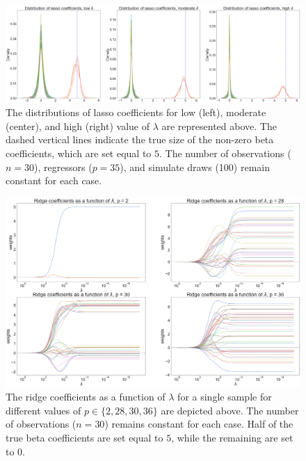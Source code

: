 \begin{figure}[H]
        \includegraphics[scale=0.17]{material/Img/lasso_shrunken_beta_dist_35.png}
        \centering
        \caption[Distribution of lasso coefficients]{The distributions of lasso coefficients for low (left), moderate (center), and high (right) value of $\lambda$ are represented above. The dashed vertical lines indicate the true size of the non-zero beta coefficients, which are set equal to $5$. The number of observations ($n=30$), regressors ($p=35$), and simulate draws (100) remain constant for each case.}
\label{fig:lasso_shrunken_betas}
\end{figure}

\begin{figure}[H]
        \includegraphics[scale=0.20]{material/Img/ridge_plot_betas.png}
        \centering
        \caption[Ridge coefficients as a function of $\lambda$ for a single sample]{The ridge coefficients as a function of $\lambda$ for a single sample for different values of $ p\in \{2,28,30,36\}$ are depicted above. The number of observations ($n=30$) remains constant for each case. Half of the true beta coefficients are set equal to $5$, while the remaining are set to $0$.}
        \label{fig:ridge_single_sample}
\end{figure}

